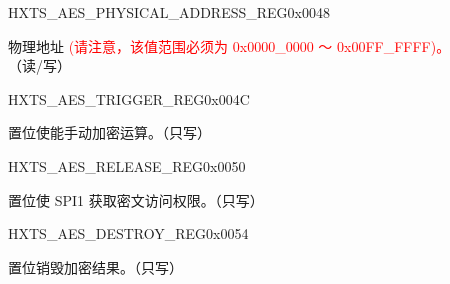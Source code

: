 \begin{register}{H}{XTS\_AES\_PHYSICAL\_ADDRESS\_REG}{0x0048}\label{regdesc:XTSAESPHYSICALADDRESSREG}
%
%
\regnewline%
\begin{regdesc}\begin{reglist}
\item [XTS\_AES\_PHYSICAL\_ADDRESS] 物理地址 \textcolor{red}{(请注意，该值范围必须为 0x0000\_0000 ～ 0x00FF\_FFFF)。} （读/写）
\end{reglist}\end{regdesc}
\end{register}

\begin{register}{H}{XTS\_AES\_TRIGGER\_REG}{0x004C}\label{regdesc:XTSAESTRIGGERREG}
%
%
\regnewline%
\begin{regdesc}\begin{reglist}
\item [XTS\_AES\_TRIGGER] 置位使能手动加密运算。（只写）
\end{reglist}\end{regdesc}
\end{register}

\begin{register}{H}{XTS\_AES\_RELEASE\_REG}{0x0050}\label{regdesc:XTSAESRELEASEREG}
%
%
\regnewline%
\begin{regdesc}\begin{reglist}
\item [XTS\_AES\_RELEASE] 置位使 SPI1 获取密文访问权限。（只写）
\end{reglist}\end{regdesc}
\end{register}

\begin{register}{H}{XTS\_AES\_DESTROY\_REG}{0x0054}\label{regdesc:XTSAESDESTROYREG}
%
%
\regnewline%
\begin{regdesc}\begin{reglist}
\item [XTS\_AES\_DESTROY] 置位销毁加密结果。（只写）
\end{reglist}\end{regdesc}
\end{register}


